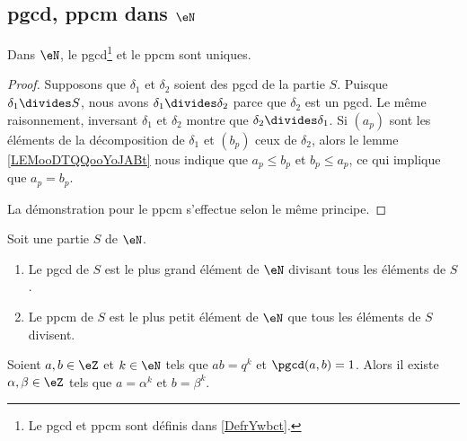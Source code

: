 \subsection{pgcd, ppcm dans \( \eN\)}


\begin{lemma}       \label{LEMooBJVJooFyuFeN}
	Dans \( \eN\), le pgcd\footnote{Le pgcd et ppcm sont définis dans \ref{DefrYwbct}.} et le ppcm sont uniques.
\end{lemma}

\begin{proof}
	Supposons que \( \delta_1\) et \( \delta_2\) soient des pgcd de la partie \( S\). Puisque \( \delta_1\divides S\), nous avons \( \delta_1\divides \delta_2\) parce que \( \delta_2\) est un pgcd. Le même raisonnement, inversant \( \delta_1\) et \( \delta_2\) montre que \( \delta_2\divides \delta_1\). Si \( (a_p)\) sont les éléments de la décomposition de \( \delta_1\) et \( (b_p)\) ceux de \( \delta_2\), alors le lemme \ref{LEMooDTQQooYoJABt} nous indique que \( a_p\leq b_p\) et \( b_p\leq a_p\), ce qui implique que \( a_p=b_p\).

	La démonstration pour le ppcm s'effectue selon le même principe.
\end{proof}

\begin{lemma}       \label{LEMooJIGRooARiIPC}
	Soit une partie \( S\) de \( \eN\).
	\begin{enumerate}
		\item
		      Le pgcd de \( S\) est le plus grand élément de \( \eN\) divisant tous les éléments de \( S\).
		\item
		      Le ppcm de \( S\) est le plus petit élément de \( \eN\) que tous les éléments de \( S\) divisent.
	\end{enumerate}
\end{lemma}

\begin{lemma}        \label{LEMooEVIZooPAkQZW}
	Soient \( a,b\in \eZ\) et \( k\in \eN\) tels que \( ab=q^k\) et \( \pgcd(a,b)=1\). Alors il existe \( \alpha,\beta\in\eZ\) tels que \( a=\alpha^k\) et \( b=\beta^k\).
\end{lemma}

